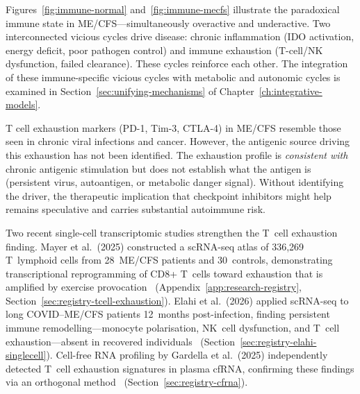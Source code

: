 

Figures~\ref{fig:immune-normal} and~\ref{fig:immune-mecfs} illustrate the paradoxical immune state in ME/CFS—simultaneously overactive and underactive. Two interconnected vicious cycles drive disease: chronic inflammation (IDO activation, energy deficit, poor pathogen control) and immune exhaustion (T-cell/NK dysfunction, failed clearance). These cycles reinforce each other. The integration of these immune-specific vicious cycles with metabolic and autonomic cycles is examined in Section~\ref{sec:unifying-mechanisms} of Chapter~\ref{ch:integrative-models}.

\begin{limitation}
T cell exhaustion markers (PD-1, Tim-3, CTLA-4) in ME/CFS resemble those seen in chronic viral infections and cancer. However, the antigenic source driving this exhaustion has not been identified. The exhaustion profile is \emph{consistent with} chronic antigenic stimulation but does not establish what the antigen is (persistent virus, autoantigen, or metabolic danger signal). Without identifying the driver, the therapeutic implication that checkpoint inhibitors might help remains speculative and carries substantial autoimmune risk.
\end{limitation}

Two recent single-cell transcriptomic studies strengthen the T~cell exhaustion
finding.  Mayer et al.\ (2025) constructed a scRNA-seq atlas of 336,269
T~lymphoid cells from 28~ME/CFS patients and 30~controls, demonstrating
transcriptional reprogramming of CD8+ T~cells toward exhaustion that is
amplified by exercise provocation~\cite{Mayer2025Tcellexhaustion}
(Appendix~\ref{app:research-registry},
Section~\ref{sec:registry-tcell-exhaustion}).  Elahi et al.\ (2026) applied
scRNA-seq to long COVID--ME/CFS patients 12~months post-infection, finding
persistent immune remodelling---monocyte polarisation, NK~cell dysfunction,
and T~cell exhaustion---absent in recovered
individuals~\cite{Elahi2026singlecell}
(Section~\ref{sec:registry-elahi-singlecell}).  Cell-free RNA profiling
by Gardella et al.\ (2025) independently detected T~cell exhaustion
signatures in plasma cfRNA, confirming these findings via an orthogonal
method~\cite{Gardella2025cfRNA}
(Section~\ref{sec:registry-cfrna}).

